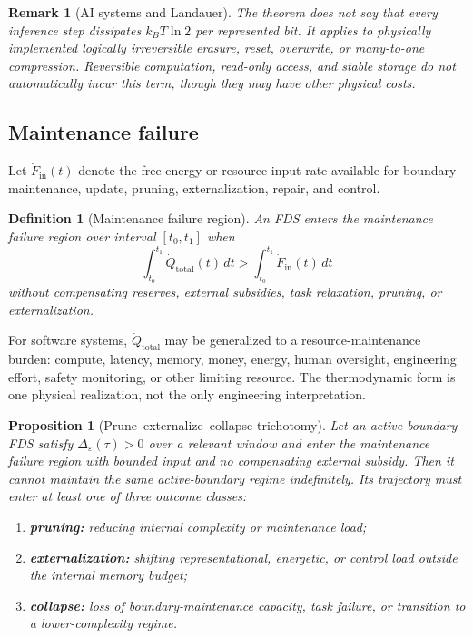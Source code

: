 \documentclass[10pt,a4paper,twocolumn,aps,prl]{revtex4-2}
\newtheorem{definition}{Definition}
\newtheorem{proposition}{Proposition}
\newtheorem{remark}{Remark}
\begin{document}
\begin{remark}[AI systems and Landauer]
The theorem does not say that every inference step dissipates $k_B T\ln2$ per represented bit. It applies to physically implemented logically irreversible erasure, reset, overwrite, or many-to-one compression. Reversible computation, read-only access, and stable storage do not automatically incur this term, though they may have other physical costs.
\end{remark}

\subsection{Maintenance failure}

Let $\dot F_{\mathrm{in}}(t)$ denote the free-energy or resource input rate available for boundary maintenance, update, pruning, externalization, repair, and control.

\begin{definition}[Maintenance failure region]
An FDS enters the maintenance failure region over interval $[t_0,t_1]$ when
\begin{equation}
\int_{t_0}^{t_1}\dot Q_{\mathrm{total}}(t)\,dt>
\int_{t_0}^{t_1}\dot F_{\mathrm{in}}(t)\,dt
\label{eq:failure-region}
\end{equation}
without compensating reserves, external subsidies, task relaxation, pruning, or externalization.
\end{definition}

For software systems, $\dot Q_{\mathrm{total}}$ may be generalized to a resource-maintenance burden: compute, latency, memory, money, energy, human oversight, engineering effort, safety monitoring, or other limiting resource. The thermodynamic form is one physical realization, not the only engineering interpretation.

\begin{proposition}[Prune--externalize--collapse trichotomy]
Let an active-boundary FDS satisfy $\Delta_{\varepsilon}(\tau)>0$ over a relevant window and enter the maintenance failure region with bounded input and no compensating external subsidy. Then it cannot maintain the same active-boundary regime indefinitely. Its trajectory must enter at least one of three outcome classes:
\begin{enumerate}[leftmargin=2em]
    \item \textbf{pruning:} reducing internal complexity or maintenance load;
    \item \textbf{externalization:} shifting representational, energetic, or control load outside the internal memory budget;
    \item \textbf{collapse:} loss of boundary-maintenance capacity, task failure, or transition to a lower-complexity regime.
\end{enumerate}
\end{proposition}
\end{document}

